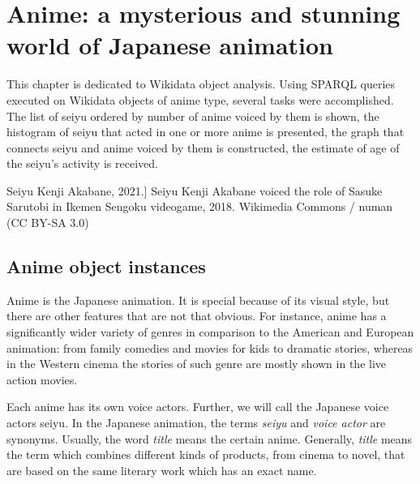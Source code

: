
\chapter{Anime: a mysterious and stunning world of Japanese animation\protect\footnotemark}




This chapter is dedicated to  Wikidata object analysis. Using SPARQL queries executed on Wikidata objects of anime type, several tasks were accomplished. The list of seiyu ordered by number of anime voiced by them is shown, the histogram of seiyu that acted in one or more anime is presented, the graph that connects seiyu and anime voiced by them is constructed, the estimate of age of the seiyu's activity is received.

\begin{marginfigure}[0.0cm]
{
	\setlength{\fboxsep}{0pt}%
	\setlength{\fboxrule}{1pt}%
}
\caption
[Seiyu Kenji Akabane, 2021.]
{
Seiyu Kenji Akabane voiced the role of Sasuke Sarutobi in Ikemen Sengoku videogame, 2018.\newline
Wikimedia Commons / numan (CC BY-SA 3.0)
}
\label{fig:seiyu}
\end{marginfigure}

\section{Anime object instances}

Anime is the Japanese animation. It is special because of its visual style, but there are other features that are not that obvious. For instance, anime has a significantly wider variety of genres in comparison to the American and European animation: from family comedies and movies for kids to dramatic stories, whereas in the Western cinema the stories of such genre are mostly shown in the live action movies.

Each anime has its own voice actors. Further, we will call the Japanese voice actors seiyu. In the Japanese animation, the terms \emph{seiyu} and \emph{voice actor} are synonyms. Usually, the word \emph{title} means the certain anime. Generally, \emph{title} means the term which combines different kinds of products, from cinema to novel, that are based on the same literary work which has an exact name.